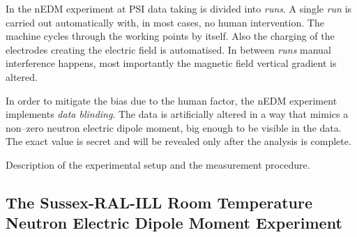In the nEDM experiment at PSI data taking is divided into \emph{runs}. A single \emph{run} is carried out automatically with, in most cases, no human intervention. The machine cycles through the working points by itself. Also the charging of the electrodes creating the electric field is automatised. In between \emph{runs} manual interference happens, most importantly the magnetic field vertical gradient is altered.

In order to mitigate the bias due to the human factor, the nEDM experiment implements \emph{data blinding}. The data is artificially altered in a way that mimics a non--zero neutron electric dipole moment, big enough to be visible in the data. The exact value is secret and will be revealed only after the analysis is complete.












Description of the experimental setup and the measurement procedure.

\subsection{The Sussex-RAL-ILL Room Temperature Neutron Electric Dipole Moment Experiment}



